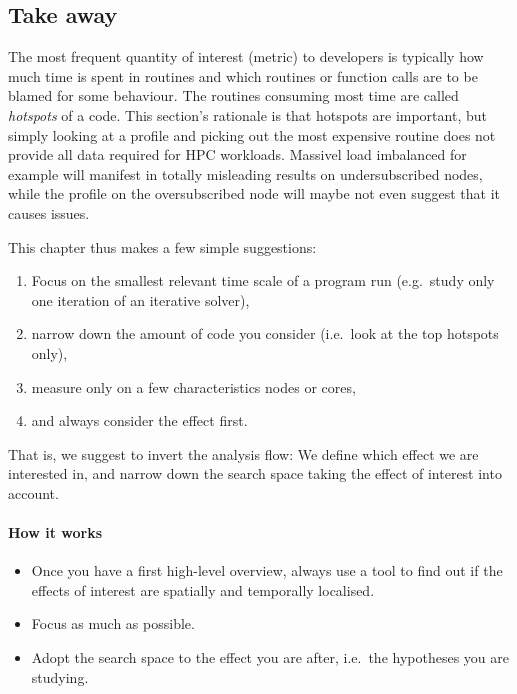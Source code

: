 \subsection{Take away}
\label{section:workflow:localisation:take-away}

The most frequent quantity of interest (metric) to developers is typically how much time is spent in routines and which routines or function calls are to be blamed for some behaviour.
The routines consuming most time are called \emph{hotspots} of a code.
This section's rationale is that hotspots are important, but simply looking at a profile and picking out the most expensive routine does not provide all data required for HPC workloads.
Massivel load imbalanced for example will manifest in totally misleading results on undersubscribed nodes, while the profile on the oversubscribed node will maybe not even suggest that it causes issues. 

This chapter thus makes a few simple suggestions:

\begin{enumerate}
  \item Focus on the smallest relevant time scale of a program run (e.g.~study only one iteration of an iterative solver),
  \item narrow down the amount of code you consider (i.e.~look at the top hotspots only),
  \item measure only on a few characteristics nodes or cores, 
  \item and always consider the effect first.
\end{enumerate}

\noindent
That is, we suggest to invert the analysis flow:
We define which effect we are interested in, and narrow down the search space taking the effect of interest into account.


\paragraph*{How it works}

\begin{itemize}[noitemsep]
  \item[$\boxplus$] Once you have a first high-level overview, always use a tool to find out if the effects of interest are spatially and temporally localised.
  \item[$\boxplus$] Focus as much as possible.
  \item[$\boxplus$] Adopt the search space to the effect you are after, i.e.~the hypotheses you are studying.
\end{itemize}


